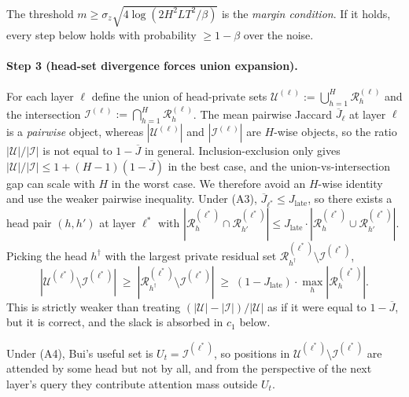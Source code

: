 The threshold $m \geq \sigma_z \sqrt{4 \log(2 H^2 L T^2 / \beta)}$ is the
\emph{margin condition}. If it holds, every step below holds with
probability $\geq 1 - \beta$ over the noise.

\paragraph{Step 3 (head-set divergence forces union expansion).}
For each layer $\ell$ define the union of head-private sets
$\mathcal{U}^{(\ell)} := \bigcup_{h=1}^{H} \mathcal{R}^{(\ell)}_h$ and
the intersection $\mathcal{I}^{(\ell)} := \bigcap_{h=1}^{H}
\mathcal{R}^{(\ell)}_h$. The mean pairwise Jaccard $\overline{J}_\ell$
at layer $\ell$ is a \emph{pairwise} object, whereas
$|\mathcal{U}^{(\ell)}|$ and $|\mathcal{I}^{(\ell)}|$ are $H$-wise
objects, so the ratio $|\mathcal{U}|/|\mathcal{I}|$ is not equal to $1 -
\overline{J}$ in general. Inclusion-exclusion only gives
$|\mathcal{U}|/|\mathcal{I}| \leq 1 + (H-1)(1 - \overline{J})$ in the
best case, and the union-vs-intersection gap can scale with $H$ in the
worst case. We therefore avoid an $H$-wise identity and use the weaker
pairwise inequality. Under (A3), $\overline{J}_{\ell^*} \leq
J_{\text{late}}$, so there exists a head pair $(h, h')$ at layer
$\ell^*$ with $|\mathcal{R}^{(\ell^*)}_h \cap
\mathcal{R}^{(\ell^*)}_{h'}| \leq J_{\text{late}} \cdot
|\mathcal{R}^{(\ell^*)}_h \cup \mathcal{R}^{(\ell^*)}_{h'}|$. Picking
the head $h^\dagger$ with the largest private residual set
$\mathcal{R}^{(\ell^*)}_{h^\dagger} \setminus \mathcal{I}^{(\ell^*)}$,
\begin{equation}
\label{eq:union-bound}
|\mathcal{U}^{(\ell^*)} \setminus \mathcal{I}^{(\ell^*)}|
\;\geq\;
|\mathcal{R}^{(\ell^*)}_{h^\dagger} \setminus \mathcal{I}^{(\ell^*)}|
\;\geq\;
(1 - J_{\text{late}}) \cdot \max_h |\mathcal{R}^{(\ell^*)}_h|.
\end{equation}
This is strictly weaker than treating $(|\mathcal{U}| -
|\mathcal{I}|)/|\mathcal{U}|$ as if it were equal to $1 -
\overline{J}$, but it is correct, and the slack is absorbed in $c_1$ below.

Under (A4), Bui's useful set is $U_t = \mathcal{I}^{(\ell^*)}$, so
positions in $\mathcal{U}^{(\ell^*)} \setminus \mathcal{I}^{(\ell^*)}$
are attended by some head but not by all, and from the perspective of
the next layer's query they contribute attention mass outside $U_t$.

